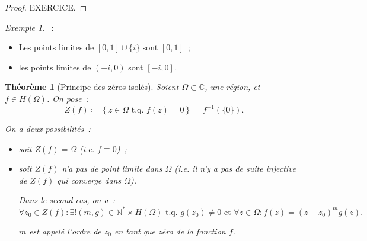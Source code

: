 \documentclass{report}
\newtheorem{thm}{Théorème}[chapter]
\theoremstyle{definition}
\theoremstyle{remark}
\newtheorem{ex}{Exemple}[chapter]
\numberwithin{equation}{section}
\newcommand{\C}{\mathbb C}
\newcommand{\N}{\mathbb N}
\newcommand{\tq}{\text{ t.q. }}
\begin{document}
			\begin{proof} EXERCICE.
			\end{proof}

			\begin{ex}~:
			\begin{itemize}
				\item Les points limites de $[0, 1] \cup \{i\}$ sont $[0, 1]$~;
				\item les points limites de $(-i, 0)$ sont $[-i, 0]$.
			\end{itemize}
			\end{ex}

			\begin{thm}[Principe des zéros isolés] Soient $\Omega \subset \C$, une région, et $f \in H(\Omega)$. On pose~:
			\begin{equation}
				Z(f) \coloneqq \left\{z \in \Omega \tq f(z) = 0\right\} = f^{-1}(\{0\}).
			\end{equation}

			On a deux possibilités~:
			\begin{itemize}
				\item soit $Z(f) = \Omega$ (i.e. $f \equiv 0$)~;
				\item soit $Z(f)$ n'a pas de point limite dans $\Omega$ (i.e. il n'y a pas de suite injective de $Z(f)$ qui converge dans $\Omega$).

				Dans le second cas, on a~:
				\begin{equation}
					\forall z_0 \in Z(f) : \exists! (m, g) \in \N^* \times H(\Omega) \tq g(z_0) \neq 0 \text{ et } \forall z \in \Omega : f(z) = (z-z_0)^mg(z).
				\end{equation}

				$m$ est appelé \textit{l'ordre de $z_0$ en tant que zéro de la fonction $f$}.
			\end{itemize}
			\end{thm}
\end{document}
